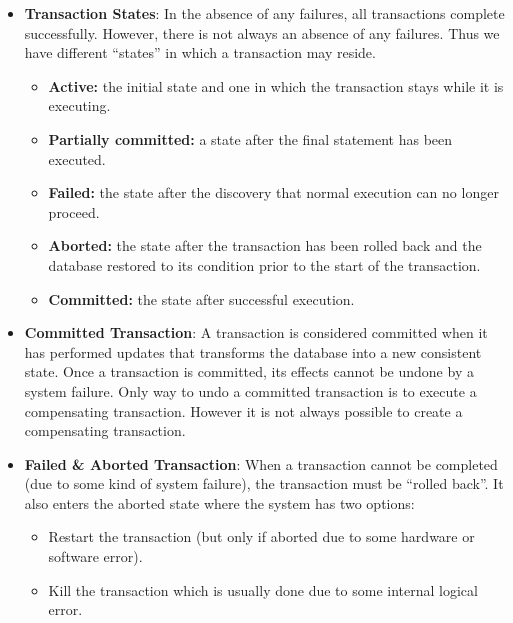 \documentclass{report}
\begin{document}
\begin{itemize}
        \item \textbf{Transaction States}: In the absence of any failures, all transactions complete successfully.
            \bigbreak \noindent 
            However, there is not always an absence of any failures.
            \bigbreak \noindent 
            Thus we have different “states” in which a transaction may reside.
            \bigbreak \noindent 
            \begin{itemize}
                \item \textbf{Active:} the initial state and one in which the transaction stays while it is executing.
                \item \textbf{Partially committed:} a state after the final statement has been executed.
                \item \textbf{Failed:} the state after the discovery that normal execution can no longer proceed.
                \item \textbf{Aborted:} the state after the transaction has been rolled back and the database restored to its condition prior to the start of the transaction.
                \item \textbf{Committed:} the state after successful execution.
            \end{itemize}
        \item \textbf{Committed Transaction}:
            A transaction is considered committed when it has performed updates that transforms the database into a new consistent state.
            \bigbreak \noindent 
            Once a transaction is committed, its effects cannot be undone by a system failure.
            \bigbreak \noindent 
            Only way to undo a committed transaction is to execute a compensating transaction.
            \bigbreak \noindent 
            However it is not always possible to create a compensating transaction.
        \item \textbf{Failed \& Aborted Transaction}: When a transaction cannot be completed (due to some kind of system failure), the transaction must be “rolled back”.
            \bigbreak \noindent 
             It also enters the aborted state where the system has two options:
             \begin{itemize}
                 \item Restart the transaction (but only if aborted due to some hardware or software error).
                 \item Kill the transaction which is usually done due to some internal logical error.

\end{itemize}
\end{itemize}
\end{document}
